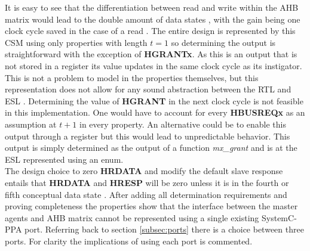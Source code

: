 It is easy to see that the differentiation between read and write within the AHB matrix would lead to the double amount of data states , with the gain being one clock cycle saved in the case of a read . The entire design is represented by this CSM using only properties with length $t=1$ so determining the output is straightforward with the exception of \textbf{HGRANTx}. As this is an output that is not stored in a register its value updates in the same clock cycle as its  instigator. This is not a problem to model in the properties themselves, but this representation does not allow for any sound abstraction between the RTL and ESL . Determining the value of \textbf{HGRANT} in the next clock cycle is not feasible in this implementation. One would have to account for every \textbf{HBUSREQx} as an assumption at $t+1$ in every property. An alternative could be to enable this output through a register but this would lead to unpredictable behavior. This output is simply determined as the output of a function \textit{mx\_grant} and is at the ESL represented using an enum. \\
\newline
The design choice to zero \textbf{HRDATA} and modify the default slave response entails that \textbf{HRDATA} and \textbf{HRESP} will be zero unless it is in the fourth or fifth conceptual data state . After adding all determination requirements and proving completeness the properties show that the interface between the master agents and AHB matrix cannot be represented using a single existing SystemC-PPA port. Referring back to section \ref{subsec:ports} there is a choice between three ports. For clarity the implications of using each port is commented.
